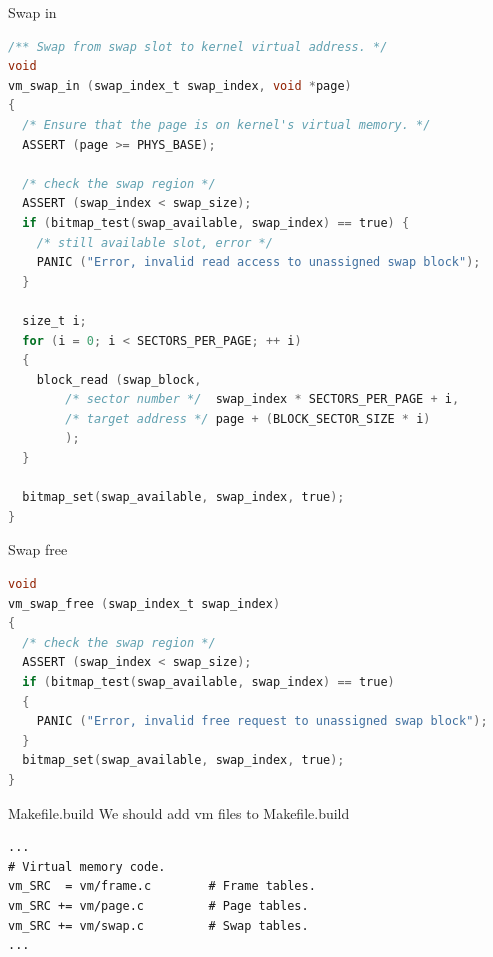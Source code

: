 \documentclass[10pt]{beamer}
\begin{document}
\begin{frame}[fragile]{Swap in}
\begin{lstlisting}[language=C]
/** Swap from swap slot to kernel virtual address. */
void 
vm_swap_in (swap_index_t swap_index, void *page)
{
  /* Ensure that the page is on kernel's virtual memory. */
  ASSERT (page >= PHYS_BASE);

  /* check the swap region */
  ASSERT (swap_index < swap_size);
  if (bitmap_test(swap_available, swap_index) == true) {
    /* still available slot, error */
    PANIC ("Error, invalid read access to unassigned swap block");
  }

  size_t i;
  for (i = 0; i < SECTORS_PER_PAGE; ++ i) 
  {
    block_read (swap_block,
        /* sector number */  swap_index * SECTORS_PER_PAGE + i,
        /* target address */ page + (BLOCK_SECTOR_SIZE * i)
        );
  }

  bitmap_set(swap_available, swap_index, true);
}
\end{lstlisting}
\end{frame}
\begin{frame}[fragile]{Swap free}
\begin{lstlisting}[language=C]
void
vm_swap_free (swap_index_t swap_index)
{
  /* check the swap region */
  ASSERT (swap_index < swap_size);
  if (bitmap_test(swap_available, swap_index) == true) 
  {
    PANIC ("Error, invalid free request to unassigned swap block");
  }
  bitmap_set(swap_available, swap_index, true);
}
\end{lstlisting}
\end{frame}
\begin{frame}[fragile]{Makefile.build}
We should add vm files to Makefile.build
\begin{lstlisting}
...
# Virtual memory code.
vm_SRC  = vm/frame.c        # Frame tables.
vm_SRC += vm/page.c         # Page tables.
vm_SRC += vm/swap.c         # Swap tables.
...
\end{lstlisting}
\end{frame}
\end{document}
